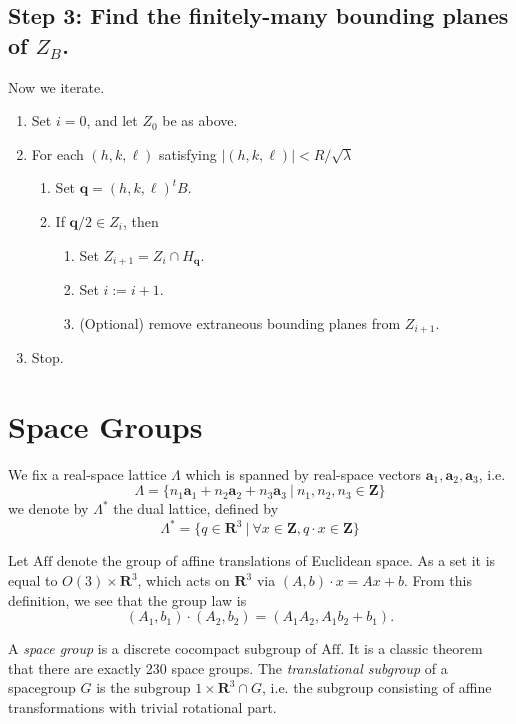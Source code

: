 \documentclass{report}
\newcommand{\ba}{\mathbf{a}}
\newcommand{\bq}{\mathbf{q}}
\newcommand{\Aff}{\mathrm{Aff}}
\begin{document}
\subsection{Step 3: Find the finitely-many bounding planes of $Z_B$.}
Now we iterate.
\begin{enumerate}
  \item Set $i = 0$, and let $Z_0$ be as above.
  \item For each $(h, k, \ell)$ satisfying $|(h,k,\ell)| < R/\sqrt\lambda$
    \begin{enumerate}
      \item Set $\bq = (h,k,\ell)^t B$.
      \item If $\bq/2 \in Z_i$, then
        \begin{enumerate}
          \item Set $Z_{i+1} = Z_i \cap H_\bq$.
          \item Set $i := i+1$.
          \item (Optional) remove extraneous bounding planes from $Z_{i+1}$.
        \end{enumerate}
    \end{enumerate}
  \item Stop.
\end{enumerate}




\section{Space Groups}

We fix a real-space lattice $\Lambda$ which is spanned by real-space vectors $\ba_1, \ba_2, \ba_3$, i.e.
\[ \Lambda = \{ n_1 \ba_1 + n_2 \ba_2 + n_3 \ba_3 \ | \ n_1, n_2, n_3 \in \mathbf{Z} \} \]
we denote by $\Lambda^\ast$ the dual lattice, defined by
\[ \Lambda^\ast = \{q \in \mathbf{R}^3 \ | \ \forall x \in \mathbf{Z}, q \cdot x \in \mathbf{Z} \} \]

Let $\Aff$ denote the group of affine translations of Euclidean space. As a set it is equal to $O(3) \times \mathbf{R}^3$,
which acts on $\mathbf{R}^3$ via $(A, b) \cdot x = Ax + b$. From this definition, we see that the group law is
\[ (A_1, b_1) \cdot (A_2, b_2) = (A_1 A_2, A_1 b_2 + b_1). \]

A \emph{space group} is a discrete cocompact subgroup of $\Aff$. It is a classic theorem that there are exactly 230 space groups.
The \emph{translational subgroup} of a spacegroup $G$ is the subgroup ${1} \times \mathbf{R}^3 \cap G$, i.e. the subgroup consisting of
affine transformations with trivial rotational part.
\end{document}
